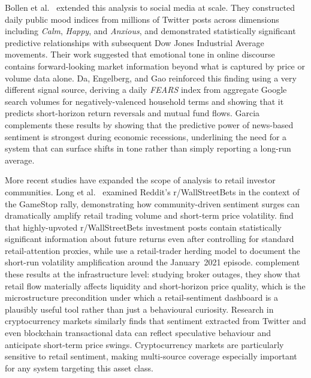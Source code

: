 Bollen et al.\ \citep{bollen2011twitter} extended this analysis to social media at scale. They constructed daily public mood indices from millions of Twitter posts across dimensions including \textit{Calm}, \textit{Happy}, and \textit{Anxious}, and demonstrated statistically significant predictive relationships with subsequent Dow Jones Industrial Average movements.  Their work suggested that emotional tone in online discourse contains forward-looking market information beyond what is captured by price or volume data alone. Da, Engelberg, and Gao \citep{da2015fears} reinforced this finding using a very different signal source, deriving a daily \textit{FEARS} index from aggregate Google search volumes for negatively-valenced household terms and showing that it predicts short-horizon return reversals and mutual fund flows. Garcia \citep{garcia2013sentiment} complements these results by showing that the predictive power of news-based sentiment is strongest during economic recessions, underlining the need for a system that can surface shifts in tone rather than simply reporting a long-run average.

More recent studies have expanded the scope of analysis to retail investor communities.  Long et al.\ \citep{long2023reddit} examined Reddit's r/WallStreetBets in the context of the GameStop rally, demonstrating how community-driven sentiment surges can dramatically amplify retail trading volume and short-term price volatility. \citet{bradley2021place} find that highly-upvoted r/WallStreetBets investment posts contain statistically significant information about future returns even after controlling for standard retail-attention proxies, while \citet{lyocsa2022yolo} use a retail-trader herding model to document the short-run volatility amplification around the January~2021 episode. \citet{eaton2022retail} complement these results at the infrastructure level: studying broker outages, they show that retail flow materially affects liquidity and short-horizon price quality, which is the microstructure precondition under which a retail-sentiment dashboard is a plausibly useful tool rather than just a behavioural curiosity. Research in cryptocurrency markets similarly finds that sentiment extracted from Twitter \citep{kraaijeveld2020predictive} and even blockchain transactional data \citep{kleitsikas2025bitcoin} can reflect speculative behaviour and anticipate short-term price swings. Cryptocurrency markets are particularly sensitive to retail sentiment, making multi-source coverage especially important for any system targeting this asset class.

